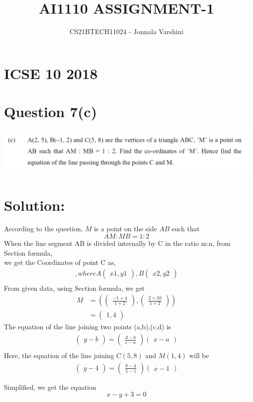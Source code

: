 \documentclass[journal,12pt,twocolumn]{IEEEtran}
\title{AI1110 ASSIGNMENT-1}
\author{CS21BTECH11024 - Jonnala Varshini}
\newcommand{\myvec}[1]{\ensuremath{\begin{pmatrix}#1\end{pmatrix}}}
\begin{document}
\maketitle
\section*{ICSE 10 2018}
\section*{Question 7(c)}
\begin{center}
    \includegraphics[scale=0.20]{prv1a.png}
\end{center}
\section*{Solution:}
According to the question, $M$ is a point on the side $AB$ such that $$AM : MB = 1 : 2$$
 When the line segment AB is divided internally by C in the ratio m:n, from Section formula,\\
 we get the Coordinates of point C as,\\
\begin{align*}
     [\myvec{\frac{mx2+nx1}{m+n}},\myvec{\frac{my2+ny1}{m+n}}], 
     where A\myvec{x1,y1}, B\myvec{x2,y2} \\
\end{align*}
From given data, using Section formula, we get
\begin{align*}
    M &= (\myvec{\frac{-1+4}{1+2}},\myvec{\frac{2+10}{1+2}})\\ 
    &= \myvec{1,4}
\end{align*}
The equation of the line joining two points (a,b),(c,d) is \\
\begin{align*}
    \myvec{y-b} = {\myvec{\frac{d-b}{c-a}}}\myvec{x-a}\\
\end{align*}
Here, the equation of the line joining $C(5,8)$ and $M(1,4)$ will be\\
\begin{align*}
    \myvec{y-4} = \myvec{\frac{8-4}{5-1}}\myvec{x-1} \\\\
\end{align*}
Simplified, we get the equation $$x-y+3=0$$
\end{document}

